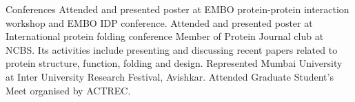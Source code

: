 \begin{rubric}{Conferences}
\entry*[2019] Attended and presented poster at EMBO protein-protein interaction workshop and EMBO IDP conference.
%
\entry*[2014, 2016] Attended and presented poster at International protein folding conference
%
\entry* [2014 - 2019] Member of Protein Journal club at NCBS. Its activities include presenting and discussing recent papers related to protein structure, function, folding and design.
%
\entry*[2011] Represented Mumbai University at Inter University Research Festival, Avishkar.
%
\entry*[ 2011] Attended Graduate Student’s Meet organised by ACTREC.

\end{rubric}